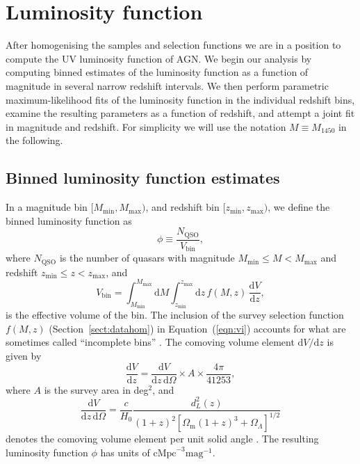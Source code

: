 \documentclass[fleqn,usenatbib]{mnras}
\begin{document}
\section{Luminosity function}
\label{sec:lf}

After homogenising the samples and selection functions we are in a
position to compute the UV luminosity function of AGN. We begin our
analysis by computing binned estimates of the luminosity function as a
function of magnitude in several narrow redshift intervals.  We then
perform parametric maximum-likelihood fits of the luminosity function
in the individual redshift bins, examine the resulting parameters as a
function of redshift, and attempt a joint fit in magnitude and
redshift.  For simplicity we will use the notation $M\equiv M_{1450}$
in the following.

\subsection{Binned luminosity function estimates}
\label{sec:binnedlf}

In a magnitude bin $[M_\mathrm{min}, M_\mathrm{max})$, and redshift
  bin $[z_\mathrm{min}, z_\mathrm{max})$, we define the binned luminosity
function as \citep{2000MNRAS.311..433P}
\begin{equation}
  \phi \equiv \frac{N_\mathrm{QSO}}{V_\mathrm{bin}},
\end{equation}
where $N_\mathrm{QSO}$ is the number of quasars with magnitude
$M_\mathrm{min}\leq M<M_\mathrm{max}$ and redshift
$z_\mathrm{min}\leq z<z_\mathrm{max}$, and
\begin{equation}
  V_\mathrm{bin} = \int_{M_\mathrm{min}}^{M_\mathrm{max}}\mathrm{d}M
  \int_{z_\mathrm{min}}^{z_\mathrm{max}}\mathrm{d}z\, f(M, z)\,\frac{\mathrm{d}V}{\mathrm{d}z},
  \label{eqn:vi}
\end{equation}
is the effective volume of the bin. The inclusion of the survey selection function
$f(M,z)$ (Section~\ref{sect:datahom}) in Equation~(\ref{eqn:vi}) accounts for
what are sometimes called ``incomplete bins''
\citep{2006AJ....131.2766R}.  The comoving volume element $\mathrm{d}V/\mathrm{d}z$ is
given by
\begin{equation}
  \frac{\mathrm{d}V}{\mathrm{d}z}=\frac{\mathrm{d}V}{\mathrm{d}z\,\mathrm{d}\Omega}\times A\times\frac{4\pi}{41253},
\end{equation}
where $A$ is the survey area in deg$^2$, and 
\begin{equation}
  \frac{\mathrm{d}V}{\mathrm{d}z\,\mathrm{d}\Omega}=\frac{c}{H_0}\frac{d_L^2\left(z\right)}
       {\left(1+z\right)^2\left[\Omega_\mathrm{m}\left(1+z\right)^3+\Omega_\Lambda\right]^{1/2}}
  \label{eqn:dvdzdo}
\end{equation}
denotes the comoving volume element per unit solid angle
\citep{1999astro.ph..5116H}. The resulting luminosity function $\phi$ has units of
$\mathrm{cMpc}^{-3}\mathrm{mag}^{-1}$. 
\end{document}
